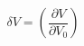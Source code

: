 \begin{equation}
\label{eq:deltaV}
\delta V = \left( \frac{\partial{V}}{\partial{V_0}}\right)
\end{equation}